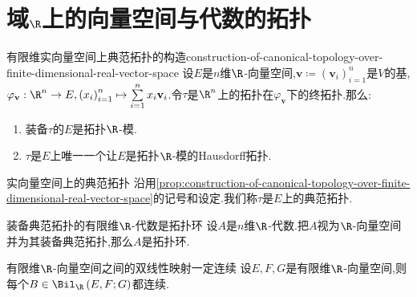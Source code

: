 \section{域\texorpdfstring{$\R$}{R}上的向量空间与代数的拓扑}

\begin{proposition}{有限维实向量空间上典范拓扑的构造}{construction-of-canonical-topology-over-finite-dimensional-real-vector-space}
	设$E$是$n$维$\R$-向量空间,$\mathbf{v}\coloneq\left(\mathbf{v}_{i}\right)_{i=1}^{n}$是$V$的基,$\varphi_{\mathbf{v}}:\R^{n}\to E,\left(x_{i}\right)_{i=1}^{n}\mapsto\sum\limits_{i=1}^{n}x_{i}\mathbf{v}_{i}$.令$\tau$是$\R^{n}$上的拓扑在$\varphi_{\mathbf{v}}$下的终拓扑.那么:
	\begin{enumerate}
		\item 装备$\tau$的$E$是拓扑$\R$-模.
		\item $\tau$是$E$上唯一一个让$E$是拓扑$\R$-模的Hausdorff拓扑.
	\end{enumerate}
\end{proposition}

\begin{definition}{实向量空间上的典范拓扑}{}
	沿用\cref{prop:construction-of-canonical-topology-over-finite-dimensional-real-vector-space}的记号和设定.我们称$\tau$是$E$上的典范拓扑.
\end{definition}

\begin{proposition}{装备典范拓扑的有限维$\R$-代数是拓扑环}{}
	设$A$是$n$维$\R$-代数.把$A$视为$\R$-向量空间并为其装备典范拓扑,那么$A$是拓扑环.
\end{proposition}

\begin{proposition}{有限维$\R$-向量空间之间的双线性映射一定连续}{}
	设$E,F,G$是有限维$\R$-向量空间,则每个$B\in\Bil_{\R}\left(E,F;G\right)$都连续.
\end{proposition}